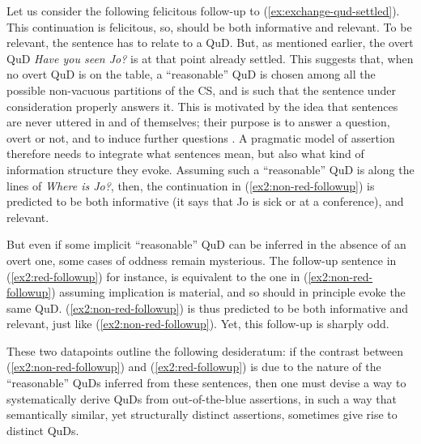 Let us consider the following felicitous follow-up to (\ref{ex:exchange-qud-settled}). This continuation is felicitous, so, should be both informative and relevant. To be relevant, the sentence has to relate to a QuD. But, as mentioned earlier, the overt QuD \textit{Have you seen Jo?} is at that point already settled. This suggests that, when no overt QuD is on the table, a ``reasonable'' QuD is chosen among all the possible non-vacuous partitions of the CS, and is such that the sentence under consideration properly answers it. This is motivated by the idea that sentences are never uttered in and of themselves; their purpose is to answer a question, overt or not, and to induce further questions \cite{Roberts1996}. A pragmatic model of assertion therefore needs to integrate what sentences mean, but also what kind of information structure they evoke. Assuming such a ``reasonable'' QuD is along the lines of \textit{Where is Jo?}, then, the continuation in (\ref{ex2:non-red-followup}) is predicted to be both informative (it says that Jo is sick or at a conference), and relevant.

\begin{exe}
	\label{ex2:non-red-followup}
\end{exe}

But even if some implicit ``reasonable'' QuD can be inferred in the absence of an overt one, some cases of oddness remain mysterious. The follow-up sentence in (\ref{ex2:red-followup}) for instance, is equivalent to the one in (\ref{ex2:non-red-followup}) assuming implication is material, and so should in principle evoke the same QuD. (\ref{ex2:non-red-followup}) is thus predicted to be both informative and relevant, just like (\ref{ex2:non-red-followup}). Yet, this follow-up is sharply odd.

\begin{exe}
	\label{ex2:red-followup}
\end{exe}

These two datapoints outline the following desideratum: if the contrast between (\ref{ex2:non-red-followup}) and (\ref{ex2:red-followup}) is due to the nature of the ``reasonable'' QuDs inferred from these sentences, then one must devise a way to systematically derive QuDs from out-of-the-blue assertions, in such a way that semantically similar, yet structurally distinct assertions, sometimes give rise to distinct QuDs.




